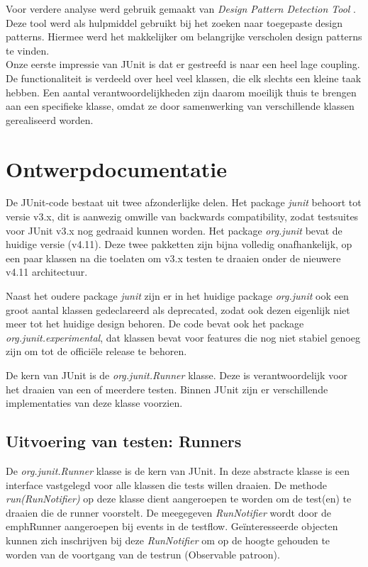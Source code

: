\documentclass[i1]{oss}
\begin{document}
Voor verdere analyse werd gebruik gemaakt van \emph{Design Pattern Detection Tool} \cite{Design Pattern Detection Tool}. Deze tool werd als hulpmiddel gebruikt bij het zoeken naar toegepaste design patterns. Hiermee werd het makkelijker om belangrijke verscholen design patterns te vinden.\\

Onze eerste impressie van JUnit is dat er gestreefd is naar een heel lage coupling. De functionaliteit is verdeeld over heel veel klassen, die elk slechts een kleine taak hebben. Een aantal verantwoordelijkheden zijn daarom moeilijk thuis te brengen aan een specifieke klasse, omdat ze door samenwerking van verschillende klassen gerealiseerd worden.\\

\section{Ontwerpdocumentatie}

De JUnit-code bestaat uit twee afzonderlijke delen. Het package \emph{junit} behoort tot versie v3.x, dit is aanwezig omwille van backwards compatibility, zodat testsuites voor JUnit v3.x nog gedraaid kunnen worden. Het package \emph{org.junit} bevat de huidige versie (v4.11). Deze twee pakketten zijn bijna volledig onafhankelijk, op een paar klassen na die toelaten om v3.x testen te draaien onder de nieuwere v4.11 architectuur.

Naast het oudere package \emph{junit} zijn er in het huidige package \emph{org.junit} ook een groot aantal klassen gedeclareerd als deprecated, zodat ook dezen eigenlijk niet meer tot het huidige design behoren. De code bevat ook het package \emph{org.junit.experimental}, dat klassen bevat voor features die nog niet stabiel genoeg zijn om tot de offici\"ele release te behoren.

De kern van JUnit is de \emph{org.junit.Runner} klasse. Deze is verantwoordelijk voor het draaien van een of meerdere testen. Binnen JUnit zijn er verschillende implementaties van deze klasse voorzien. 

\subsection{Uitvoering van testen: Runners}

De \emph{org.junit.Runner} klasse is de kern van JUnit. In deze abstracte klasse is een interface vastgelegd voor alle klassen die tests willen draaien. De methode \emph{run(RunNotifier)} op deze klasse dient aangeroepen te worden om de test(en) te draaien die de runner voorstelt. De meegegeven \emph{RunNotifier} wordt door de emph{Runner} aangeroepen bij events in de testflow. Ge\"interesseerde objecten kunnen zich inschrijven bij deze \emph{RunNotifier} om op de hoogte gehouden te worden van de voortgang van de testrun (Observable patroon).
\end{document}
